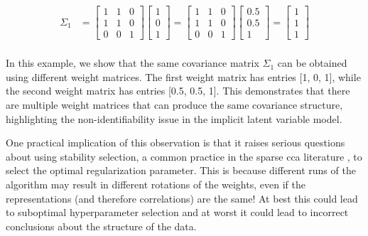 \begin{align}
    \Sigma_{1} &= \begin{bmatrix}
                         1 & 1 & 0 \\
                         1 & 1 & 0 \\
                         0 & 0 & 1
    \end{bmatrix}\begin{bmatrix}
                     1 \\
                     0 \\
                     1
    \end{bmatrix}=
    \begin{bmatrix}
        1 & 1 & 0 \\
        1 & 1 & 0 \\
        0 & 0 & 1
    \end{bmatrix}\begin{bmatrix}
                     0.5 \\
                     0.5 \\
                     1
    \end{bmatrix}= \begin{bmatrix}
                        1 \\
                        1 \\
                        1
    \end{bmatrix} \\
\end{align}

In this example, we show that the same covariance matrix $\Sigma_1$ can be obtained using different weight matrices. The first weight matrix has entries [1, 0, 1], while the second weight matrix has entries [0.5, 0.5, 1]. This demonstrates that there are multiple weight matrices that can produce the same covariance structure, highlighting the non-identifiability issue in the implicit latent variable model.

One practical implication of this observation is that it raises serious questions about using stability selection, a common practice in the sparse \acrshort{cca} literature \citep{mihalik2020multiple, deng2021sparse}, to select the optimal regularization parameter.
This is because different runs of the algorithm may result in different rotations of the weights, even if the representations (and therefore correlations) are the same!
At best this could lead to suboptimal hyperparameter selection and at worst it could lead to incorrect conclusions about the structure of the data.

